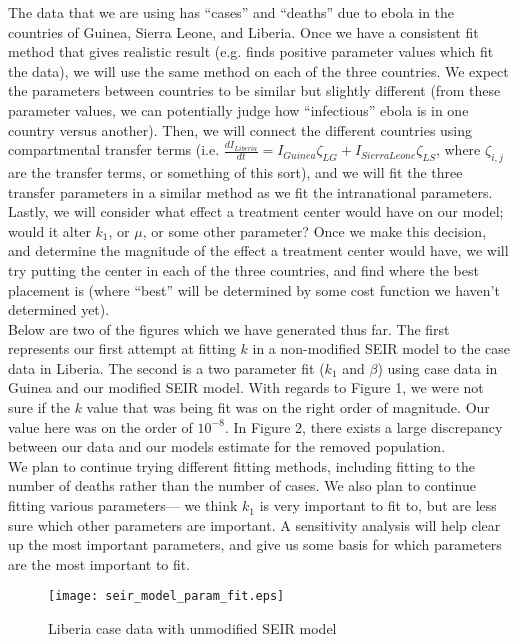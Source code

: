 \documentclass{article}
\begin{document}
The data that we are using has ``cases'' and ``deaths'' due to ebola in the countries of Guinea, Sierra Leone, and Liberia. Once we have a consistent fit method that gives realistic result (e.g. finds positive parameter values which fit the data), we will use the same method on each of the three countries. We expect the parameters between countries to be similar but slightly different (from these parameter values, we can potentially judge how ``infectious'' ebola is in one country versus another). Then, we will connect the different countries using compartmental transfer terms (i.e. $\displaystyle \frac{dI_{Liberia}}{dt} = I_{Guinea}\zeta_{LG} + I_{SierraLeone}\zeta_{LS}$, where $\zeta_{i,j}$ are the transfer terms, or something of this sort), and we will fit the three transfer parameters in a similar method as we fit the intranational parameters. \\

Lastly, we will consider what effect a treatment center would have on our model; would it alter $k_1$, or $\mu$, or some other parameter? Once we make this decision, and determine the magnitude of the effect a treatment center would have, we will try putting the center in each of the three countries, and find where the best placement is (where ``best'' will be determined by some cost function we haven't determined yet). \\

Below are two of the figures which we have generated thus far. The first represents our first attempt at fitting $k$ in a non-modified SEIR model to the case data in Liberia. The second is a two parameter fit ($k_1$ and $\beta$) using case data in Guinea and our modified SEIR model. 
With regards to Figure 1, we were not sure if the $k$ value that was being fit was on the right order of magnitude. Our value here was on the order of $10^{-8}$. In Figure 2, there exists a large discrepancy between our data and our models estimate for the removed population. \\

We plan to continue trying different fitting methods, including fitting to the number of deaths rather than the number of cases. We also plan to continue fitting various parameters--- we think $k_1$ is very important to fit to, but are less sure which other parameters are important. A sensitivity analysis will help clear up the most important parameters, and give us some basis for which parameters are the most important to fit.


      \begin{figure}[H]
            	\centering
        		\texttt{[image: seir\_model\_param\_fit.eps]}
                \caption{Liberia case data with unmodified SEIR model}
       \end{figure}
            
\end{document}
